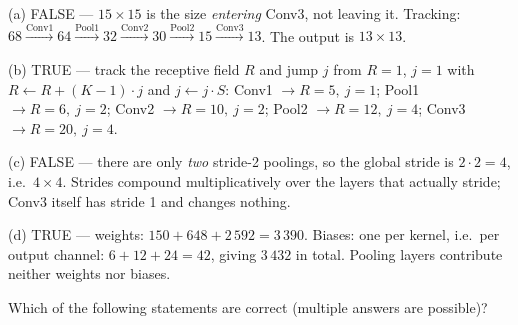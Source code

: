 \documentclass[11pt]{exam}
\newcommand{\TFT}{\ifprintanswers\textbf{TRUE}\hspace{1.1em}False\else True\hspace{1.1em}False\fi}
\newcommand{\TFF}{True\hspace{1.1em}\ifprintanswers\textbf{FALSE}\else False\fi}
\begin{document}
\begin{questions}

\begin{solution}
  (a) FALSE --- $15 \times 15$ is the size \emph{entering} Conv3, not leaving it. Tracking:
  $68 \xrightarrow{\text{Conv1}} 64 \xrightarrow{\text{Pool1}} 32 \xrightarrow{\text{Conv2}} 30
  \xrightarrow{\text{Pool2}} 15 \xrightarrow{\text{Conv3}} 13$. The output is $13 \times 13$.

  (b) TRUE --- track the receptive field $R$ and jump $j$ from $R = 1$, $j = 1$ with
  $R \leftarrow R + (K-1)\cdot j$ and $j \leftarrow j \cdot S$:
  Conv1 $\rightarrow R = 5,\ j = 1$; Pool1 $\rightarrow R = 6,\ j = 2$;
  Conv2 $\rightarrow R = 10,\ j = 2$; Pool2 $\rightarrow R = 12,\ j = 4$;
  Conv3 $\rightarrow R = 20,\ j = 4$.

  (c) FALSE --- there are only \emph{two} stride-2 poolings, so the global stride is
  $2 \cdot 2 = 4$, i.e.\ $4 \times 4$. Strides compound multiplicatively over the layers that
  actually stride; Conv3 itself has stride 1 and changes nothing.

  (d) TRUE --- weights: $150 + 648 + 2\,592 = 3\,390$. Biases: one per kernel, i.e.\ per output
  channel: $6 + 12 + 24 = 42$, giving $3\,432$ in total. Pooling layers contribute neither weights
  nor biases.
\end{solution}

\question
Which of the following statements are correct (multiple answers are possible)?


\end{questions}
\end{document}
